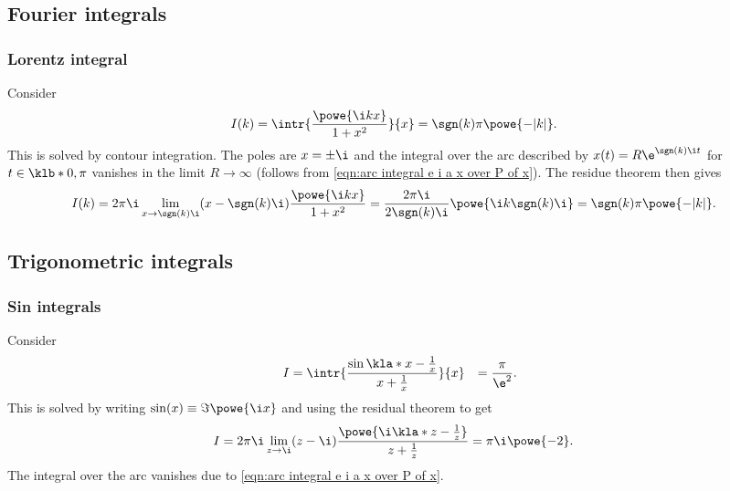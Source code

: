 \documentclass[english, parskip=full]{scrartcl}
\begin{document}
\subsection{Fourier integrals}
\subsubsection{Lorentz integral}
Consider
\begin{align}
I(k) &= \intr{\frac{\powe{\i kx}}{1 + x^2}}{x} = \sgn(k) \pi \powe{-|k|}. \label{eqn:FFT 1 over 1 plus x squared}
\end{align}
This is solved by contour integration.
The poles are $x=\pm\i$ and the integral over the arc described by $x(t) = R\e^{\sgn (k) \i t}$ for $t\in\klb*{0,\pi}$ vanishes in the limit $R\rightarrow\infty$ (follows from \autoref{eqn:arc integral e i a x over P of x}).
The residue theorem then gives
\begin{align}
I(k) &= 2\pi\i \lim_{x\rightarrow \sgn(k)  \i} (x- \sgn(k) \i) \frac{\powe{\i kx}}{1 + x^2} = \frac{2\pi\i}{2\sgn (k) \i} \powe{\i k \sgn (k) \i} = \sgn(k) \pi \powe{-|k|}.
\end{align}


\subsection{Trigonometric integrals}
\subsubsection{Sin integrals}
Consider
\begin{align}
I &= \intr{\frac{\sin\kla*{x - \frac{1}{x}} }{x + \frac{1}{x}}}{x} &= \frac{\pi}{\e^2}. \label{eqn:sin x minus 1 over x over x plus 1 over x}
\end{align}
This is solved by writing $\sin(x) \equiv \Im \powe{\i x}$ and using the residual theorem to get
\begin{align}
I &= 2\pi\i \lim_{z\rightarrow\i} (z - \i) \frac{\powe{\i \kla*{z - \frac{1}{z}}}}{z + \frac{1}{z}} = \pi\i \powe{-2}.
\end{align}
The integral over the arc vanishes due to \autoref{eqn:arc integral e i a x over P of x}.
\end{document}
